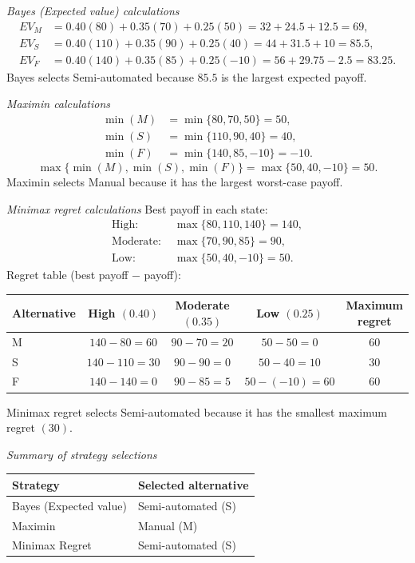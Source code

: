 \begin{ExamProblems}
		\textit{Bayes (Expected value) calculations}
		\[
		\begin{aligned}
		EV_M &= 0.40(80)+0.35(70)+0.25(50)=32+24.5+12.5=69,\\
		EV_S &= 0.40(110)+0.35(90)+0.25(40)=44+31.5+10=85.5,\\
		EV_F &= 0.40(140)+0.35(85)+0.25(-10)=56+29.75-2.5=83.25.
		\end{aligned}
		\]
		Bayes selects Semi-automated because $85.5$ is the largest expected payoff.
		
		\textit{Maximin calculations}
		\[
		\begin{aligned}
		\min(M) &= \min\{80,70,50\}=50,\\
		\min(S) &= \min\{110,90,40\}=40,\\
		\min(F) &= \min\{140,85,-10\}=-10.
		\end{aligned}
		\]
		\[
		\max\{\min(M),\min(S),\min(F)\}=\max\{50,40,-10\}=50.
		\]
		Maximin selects Manual because it has the largest worst-case payoff.
		
		\textit{Minimax regret calculations}
		Best payoff in each state:
		\[
		\begin{aligned}
		\text{High: } &\max\{80,110,140\}=140,\\
		\text{Moderate: } &\max\{70,90,85\}=90,\\
		\text{Low: } &\max\{50,40,-10\}=50.
		\end{aligned}
		\]
		Regret table (best payoff $-$ payoff):
		\begin{center}
			\begin{tabular}{l c c c c}
				\toprule
				Alternative & High $(0.40)$ & Moderate $(0.35)$ & Low $(0.25)$ & Maximum regret \\
				\midrule
				M & $140-80=60$ & $90-70=20$ & $50-50=0$ & 60 \\
				S & $140-110=30$ & $90-90=0$ & $50-40=10$ & 30 \\
				F & $140-140=0$ & $90-85=5$ & $50-(-10)=60$ & 60 \\
				\bottomrule
			\end{tabular}
		\end{center}
		Minimax regret selects Semi-automated because it has the smallest maximum regret $(30)$.
		
		\textit{Summary of strategy selections}
		\begin{center}
			\begin{tabular}{l l}
				\toprule
				Strategy & Selected alternative \\
				\midrule
				Bayes (Expected value) & Semi-automated (S) \\
				Maximin & Manual (M) \\
				Minimax Regret & Semi-automated (S) \\
				\bottomrule
			\end{tabular}
		\end{center}
		

\end{ExamProblems}
